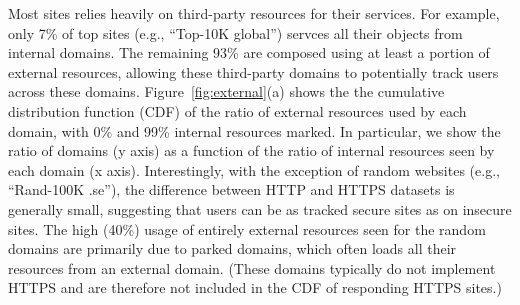 \documentclass{sig-alternate-10pt}
\begin{document}
Most sites relies heavily on third-party resources for their services.
For example, only 7\% of top sites (e.g., ``Top-10K global'') servces 
all their objects from internal domains.
The remaining 93\% are composed using at least
a portion of external resources, allowing these third-party domains to potentially track
users across these domains.
Figure~\ref{fig:external}(a) shows the the cumulative distribution function (CDF) 
of the ratio of external resources used by each domain, with 0\% and 99\% internal resources marked. 
In particular, we show the ratio of domains (y axis) as a function of the ratio 
of internal resources seen by each domain (x axis).
Interestingly, 
with the exception of random websites (e.g., ``Rand-100K .se''),
the difference between HTTP and HTTPS datasets is generally small, 
suggesting that users can be as tracked secure sites as on insecure sites.
The high (40\%) usage of entirely external resources seen for the
random domains are primarily due to parked domains,
which often loads all their resources from an external domain.
(These domains typically do not implement HTTPS and are therefore not
included in the CDF of responding HTTPS sites.)



\end{document}
